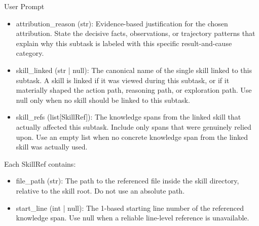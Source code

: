 \documentclass{llmxive}
\providecommand{\svinlinecode}[1]{{\ttfamily #1}}
\begin{document}
\begin{svpromptbox}{User Prompt}
\begin{itemize}
\begin{itemize}
\item \svinlinecode{fail\_unknown\_env}: The subtask clearly failed due to some environmental cause, but the evidence is insufficient to distinguish client environment from external environment.
\item \svinlinecode{uncertain\_human\_judge\_required}: The result fundamentally depends on human preference-based review or evaluation, but such judgement is unavailable.
\item \svinlinecode{uncertain\_environment\_judge\_inconclusive}: Some environment-based signal exists, but it is not sufficient to conclusively establish success or failure for the full goal.
\item \svinlinecode{uncertain\_no\_judge}: No explicit judge signal exists, and the task is not simple enough to be treated as self-evident.
\end{itemize}
\item \svinlinecode{attribution\_reason} (\svinlinecode{str}): Evidence-based justification for the chosen attribution. State the decisive facts, observations, or trajectory patterns that explain why this subtask is labeled with this specific result-and-cause category.
\item \svinlinecode{skill\_linked} (\svinlinecode{str | null}): The canonical name of the single skill linked to this subtask. A skill is linked if it was viewed during this subtask, or if it materially shaped the action path, reasoning path, or exploration path. Use \svinlinecode{null} only when no skill should be linked to this subtask.
\item \svinlinecode{skill\_refs} (\svinlinecode{list[SkillRef]}): The knowledge spans from the linked skill that actually affected this subtask. Include only spans that were genuinely relied upon. Use an empty list when no concrete knowledge span from the linked skill was actually used.
\end{itemize}
\smallskip
Each \svinlinecode{SkillRef} contains:\par
\smallskip
\begin{itemize}
\item \svinlinecode{file\_path} (\svinlinecode{str}): The path to the referenced file inside the skill directory, relative to the skill root. Do not use an absolute path.
\item \svinlinecode{start\_line} (\svinlinecode{int | null}): The 1-based starting line number of the referenced knowledge span. Use \svinlinecode{null} when a reliable line-level reference is unavailable.

\end{itemize}
\end{svpromptbox}
\end{document}
